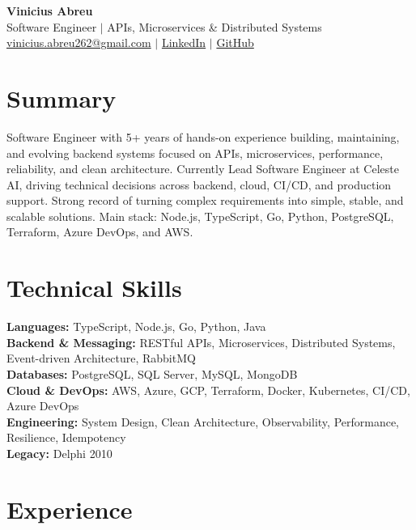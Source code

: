 \documentclass[11pt,a4paper]{article}
\begin{document}
{\LARGE \textbf{Vinicius Abreu}} \\[4pt]
Software Engineer $|$ APIs, Microservices \& Distributed Systems \\[6pt]

\href{mailto:vinicius.abreu262@gmail.com}{vinicius.abreu262@gmail.com} $|$
\href{https://www.linkedin.com/in/vs-abreu/}{LinkedIn} $|$
\href{https://github.com/vinnedev}{GitHub} \\[10pt]

\section*{Summary}
Software Engineer with 5+ years of hands-on experience building, maintaining, and evolving backend systems focused on APIs, microservices, performance, reliability, and clean architecture. Currently Lead Software Engineer at Celeste AI, driving technical decisions across backend, cloud, CI/CD, and production support. Strong record of turning complex requirements into simple, stable, and scalable solutions. Main stack: Node.js, TypeScript, Go, Python, PostgreSQL, Terraform, Azure DevOps, and AWS.

\section*{Technical Skills}
\textbf{Languages:} TypeScript, Node.js, Go, Python, Java \\[3pt]
\textbf{Backend \& Messaging:} RESTful APIs, Microservices, Distributed Systems, Event-driven Architecture, RabbitMQ \\[3pt]
\textbf{Databases:} PostgreSQL, SQL Server, MySQL, MongoDB \\[3pt]
\textbf{Cloud \& DevOps:} AWS, Azure, GCP, Terraform, Docker, Kubernetes, CI/CD, Azure DevOps \\[3pt]
\textbf{Engineering:} System Design, Clean Architecture, Observability, Performance, Resilience, Idempotency \\[3pt]
\textbf{Legacy:} Delphi 2010

\section*{Experience}
\end{document}
